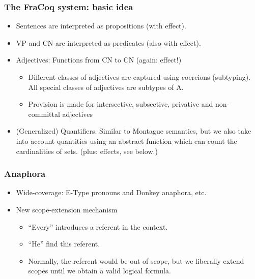 \documentclass[11pt]{beamer}
\begin{document}
\begin{frame}
  \frametitle{The FraCoq system: basic idea}
  \begin{itemize}
  \item Sentences are interpreted as propositions (with effect). 
  \item VP and CN are interpreted as predicates (also with effect).
  \item Adjectives: Functions from CN to CN (again: effect!)
    \begin{itemize}
    \item Different classes of adjectives are captured using coercions (subtyping). All special classes of adjectives are subtypes of A.
    \item Provision is made for intersective, subsective, privative and non-committal adjectives
    \end{itemize}
  \item (Generalized) Quantifiers. Similar to Montague semantics, but
    we also take into account quantities using an abstract function
    which can count the cardinalities of sets. (plus: effects, see below.)
  \end{itemize}
\end{frame}


\begin{frame}
  \frametitle{Anaphora}
  \begin{itemize}
  \item Wide-coverage: E-Type pronouns and Donkey anaphora, etc.
  \item New scope-extension mechanism
    \begin{itemize}
    \item ``Every'' introduces a referent in the context.
    \item ``He'' find this referent.
    \item Normally, the referent would be out of scope, but we
      liberally extend scopes until we obtain a valid logical formula.
    \end{itemize}
  \end{itemize}
\end{frame}
\end{document}
